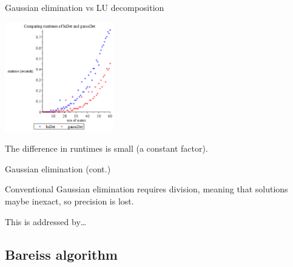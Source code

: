 \documentclass{beamer}
\begin{document}
\begin{frame}{Gaussian elimination vs LU decomposition}

    \begin{center}{}
        \includegraphics[height=180]{lu-gauss}
    \end{center}

    The difference in runtimes is small (a constant factor).
\end{frame}

\begin{frame}{Gaussian elimination (cont.)}

    Conventional Gaussian elimination requires division, meaning that solutions maybe inexact,
    so precision is lost.

    This is addressed by\dots

\end{frame}

\subsection{Bareiss algorithm}
\end{document}
